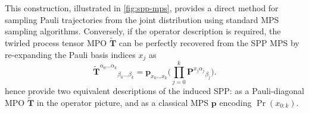 This construction, illustrated in \cref{fig:spp-mps}, provides a direct method for sampling Pauli trajectories from the joint distribution using standard MPS sampling algorithms. Conversely, if the operator description is required, the twirled process tensor MPO \(\widetilde{\mathbf{T}}\) can be perfectly recovered from the SPP MPS by re-expanding the Pauli basis indices \(x_j\) as
\begin{equation}\label{eq:spp-mps-to-pt}
  \widetilde{\mathbf{T}}^{\alpha_0\dots \alpha_k}{}_{\beta_0 \dots \beta_k} 
  =
  \mathbf{p}_{x_0\dots x_k}\Bigg(
    \prod_{j=0}^k \mathbf{P}^{x_j\alpha_j}{}_{\beta_j}
  \Bigg).
\end{equation}
 hence provide two equivalent descriptions of the induced SPP: as a Pauli-diagonal MPO \(\widetilde{\mathbf{T}}\) in the operator picture, and as a classical MPS \(\mathbf{p}\) encoding \(\Pr(x_{0:k})\).

